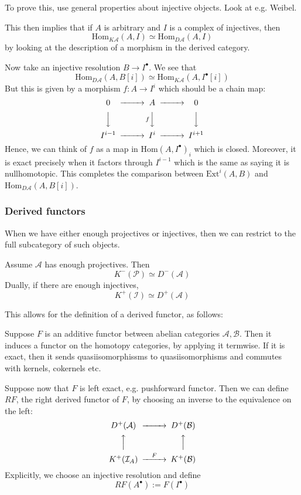 To prove this, use general properties about injective objects. Look at e.g. Weibel.

This then implies that if $A$ is arbitrary and $I$ is a complex of injectives, then $$\mathrm{Hom}_{K\mathcal{A}}(A,I)\simeq \mathrm{Hom}_{D\mathcal{A}}(A,I)$$by looking at the description of a morphism in the derived category.

Now take an injective resolution $B\rightarrow I^\bullet$. We see that $$\mathrm{Hom}_{D\mathcal{A}}(A,B[i])\simeq \mathrm{Hom}_{K\mathcal{A}}(A,I^\bullet[i])$$But this is given by a morphism $f:A\rightarrow I^i$ which should be a chain map: 
$$\begin{CD}0 @> > > A @> > > 0 \\ @VVV @VfVV @VVV \\ I^{i-1} @> > > I^i @> > > I^{i+1} \end{CD}$$
Hence, we can think of $f$ as a map in $\mathrm{Hom}(A, I^\bullet)_{i}$ which is closed. Moreover, it is exact precisely when it factors through $I^{i-1}$ which is the same as saying it is nullhomotopic. This completes the comparison between $\mathrm{Ext}^i(A,B)$ and $\mathrm{Hom}_{D\mathcal{A}}(A,B[i])$. 

\subsubsection{Derived functors}
When we have either enough projectives or injectives, then we can restrict to the full subcategory of such objects. 

\begin{theorem}{}{}
    Assume $\mathcal{A}$ has enough projectives. Then $$K^{-}(\mathcal{P})\simeq D^{-}(\mathcal{A})$$Dually, if there are enough injectives, $$K^{+}(\mathcal{I})\simeq D^{+}(\mathcal{A})$$
\end{theorem}

This allows for the definition of a derived functor, as follows:

Suppose $F$ is an additive functor between abelian categories $\mathcal{A}, \mathcal{B}$. Then it induces a functor on the homotopy categories, by applying it termwise. If it is exact, then it sends quasiisomorphissms to quasiisomorphisms and commutes with kernels, cokernels etc.

Suppose now that $F$ is left exact, e.g. pushforward functor. Then we can define $RF$, the right derived functor of $F$, by choosing an inverse to the equivalence on the left:  $$\begin{CD} D^+(\mathcal{A)} @> > > D^+(\mathcal{B)} \\ @A A A  @A A A \\ K^+(\mathcal{I}_{A})@> F> >K^+(\mathcal{B}) \end{CD}$$
Explicitly, we choose an injective resolution and define $$RF(A^\bullet):=F(I^\bullet)$$

